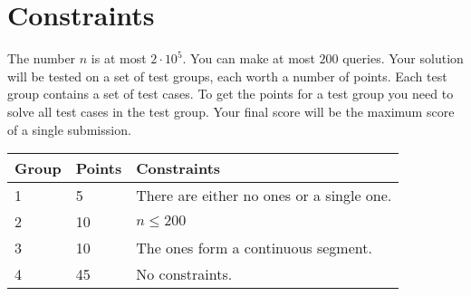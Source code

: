 \section*{Constraints}
The number $n$ is at most $2 \cdot 10^5$. You can make at most $200$ queries.
Your solution will be tested on a set of test groups, each worth a number of points.
Each test group contains a set of test cases.
To get the points for a test group you need to solve all test cases in the test group.
Your final score will be the maximum score of a single submission.

\noindent
\begin{tabular}{| l | l | l |}
\hline
Group & Points & Constraints \\ \hline
1     & 5     & There are either no ones or a single one. \\ \hline
2     & 10    & $n \leq 200$ \\ \hline
3     & 10    & The ones form a continuous segment. \\ \hline
4     & 45    & No constraints. \\ \hline
\end{tabular}
